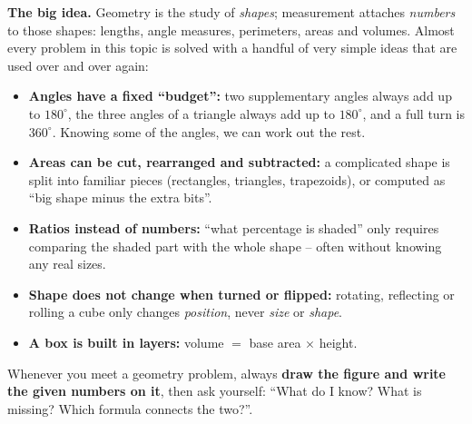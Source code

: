\documentclass[11pt]{article}
\begin{document}
\begin{knowbox}
\textbf{The big idea.} Geometry is the study of \emph{shapes}; measurement attaches \emph{numbers} to those shapes: lengths, angle measures, perimeters, areas and volumes. Almost every problem in this topic is solved with a handful of very simple ideas that are used over and over again:
\begin{itemize}[leftmargin=1.3em,itemsep=1pt,topsep=2pt]
  \item \textbf{Angles have a fixed ``budget'':} two supplementary angles always add up to $180^\circ$, the three angles of a triangle always add up to $180^\circ$, and a full turn is $360^\circ$. Knowing some of the angles, we can work out the rest.
  \item \textbf{Areas can be cut, rearranged and subtracted:} a complicated shape is split into familiar pieces (rectangles, triangles, trapezoids), or computed as ``big shape minus the extra bits''.
  \item \textbf{Ratios instead of numbers:} ``what percentage is shaded'' only requires comparing the shaded part with the whole shape -- often without knowing any real sizes.
  \item \textbf{Shape does not change when turned or flipped:} rotating, reflecting or rolling a cube only changes \emph{position}, never \emph{size} or \emph{shape}.
  \item \textbf{A box is built in layers:} volume $=$ base area $\times$ height.
\end{itemize}
Whenever you meet a geometry problem, always \textbf{draw the figure and write the given numbers on it}, then ask yourself: ``What do I know? What is missing? Which formula connects the two?''.
\end{knowbox}
\vspace{0.3cm}
\end{document}
